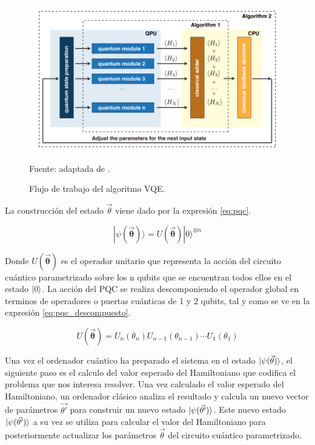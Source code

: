 \begin{figure}[!ht]
    \centering
    \includegraphics[scale = 0.7]{img/03-vqe_workflow.png}
    \caption{Flujo de trabajo del algoritmo VQE.}
    Fuente: adaptada de \citep{peruzzo}.
    \label{fig:vqe}
\end{figure}

La construcción del estado $\Vec{\theta}$ viene dado por la expresión \ref{eq:pqc}.

\begin{equation}
    |\psi(\boldsymbol{\Vec{\theta}}) \rangle = U(\boldsymbol{\Vec{\theta}}) |0\rangle^{\otimes n}
    \label{eq:pqc}
\end{equation}

Donde $U(\boldsymbol{\Vec{\theta}})$ es el operador unitario que representa la acción del circuito cuántico parametrizado sobre los n qubits que se encuentran todos ellos en el estado $\ket{0}$. La acción del PQC se realiza descomponiendo el operador global en terminos de operadores o puertas cuánticas de 1 y 2 qubits, tal y como se ve en la expresión \ref{eq:pqc_descompuesto}.

\begin{equation}
    U(\boldsymbol{\Vec{\theta}}) = U_n(\theta_n) U_{n-1}(\theta_{n-1}) \cdots U_1(\theta_1)
    \label{eq:pqc_descompuesto}
\end{equation}

Una vez el ordenador cuántico ha preparado el sistema en el estado $\ket{\psi(\Vec{\theta})}$, el siguiente paso es el calculo del valor esperado del Hamiltoniano que codifica el problema que nos interesa resolver. Una vez calculado el valor esperado del Hamiltoniano, un ordenador clásico analiza el resultado y calcula un nuevo vector de parámetros $\Vec{\theta'}$ para construir un nuevo estado $\ket{\psi(\Vec{\theta'})}$. Este nuevo estado $\ket{\psi(\Vec{\theta'})}$ a su vez se utiliza para calcular el valor del Hamiltoniano para posteriormente actualizar los parámetros $\Vec{\theta}$ del circuito cuántico parametrizado.

